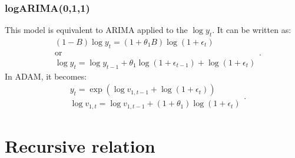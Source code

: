 \documentclass[]{book}
\theoremstyle{definition}
\theoremstyle{definition}
\theoremstyle{definition}
\theoremstyle{definition}
\theoremstyle{remark}
\begin{document}
\hypertarget{logarima011}{%
\subsubsection{logARIMA(0,1,1)}\label{logarima011}}

This model is equivalent to ARIMA applied to the \(\log y_t\). It can be written as:
\begin{equation*}
    \begin{aligned}
        &(1-B) \log y_t = (1+\theta_1 B) \log(1+\epsilon_t) \\
        &\text{or} \\
        &\log y_{t} = \log y_{t-1} + \theta_1 \log(1+\epsilon_{t-1}) + \log(1+\epsilon_t)
    \end{aligned}.
\end{equation*}
In ADAM, it becomes:
\begin{equation}
  \begin{aligned}
    &{y}_{t} = \exp (\log v_{1,t-1} + \log(1+\epsilon_t)) \\
    &\log v_{1,t} = \log v_{1,t-1} + (1 + \theta_1) \log(1+\epsilon_t)
  \end{aligned}.
  \label{eq:ADAMARIMAExpanded011log}
\end{equation}

\hypertarget{ADAMARIMARecursive}{%
\section{Recursive relation}\label{ADAMARIMARecursive}}
\end{document}

